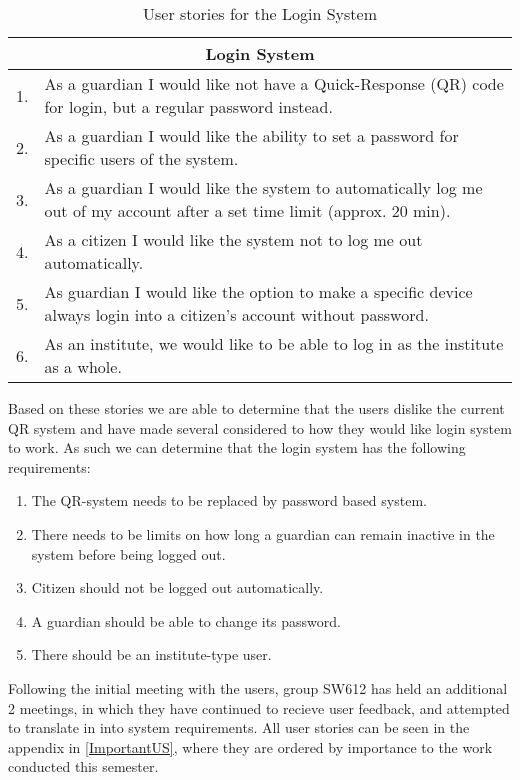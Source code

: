 \begin{table}[H]
\begin{tabular}{|c|p{12.5cm}|}
\hline 
\multicolumn{2}{|c|}{Login System}\\ \hline 
1. & As a guardian I would like not have a Quick-Response (QR) code for login,
but a regular password instead.\\ \hline 
2. & As a guardian I would like the ability to set a password for specific users
of the system.\\ \hline
3. & As a guardian I would like the system to automatically log me out of my
account after a set time limit (approx. 20 min).\\ \hline
4. & As a citizen I would like the system not to log me out automatically.\\ \hline
5. & As guardian I would like the option to make a specific device always login
into a citizen's account without password.\\ \hline
6. & As an institute, we would like to be able to log in as the institute as a
whole.\\\hline
\end{tabular}
\caption{User stories for the Login System}
\label{UserStoriesLogin}
\end{table}
 
Based on these stories we are able to determine that the users dislike the
current QR system and have made several considered to how they would like login
system to work. As such we can determine that the login system has the following
requirements:

 \begin{enumerate}
   \item The QR-system needs to be replaced by password based system.
   \item There needs to be limits on how long a guardian can remain inactive in
   the system before being logged out. 
   \item Citizen should not be logged out automatically. 
   \item A guardian should be able to change its password.
   \item There should be an institute-type user.
 \end{enumerate}%

Following the initial meeting with the users, group SW612 has held an additional
2 meetings, in which they have continued to recieve user feedback, and attempted
to translate in into system requirements. All user stories can be seen in the
appendix in \autoref{ImportantUS}, where they are ordered by importance to the
work conducted this semester.













